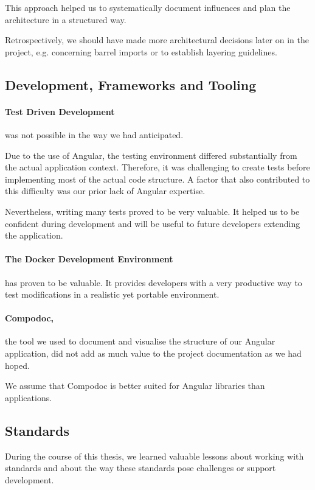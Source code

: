 This approach helped us to systematically document influences and plan the architecture in a structured way.

Retrospectively, we should have made more architectural decisions later on in the project, e.g. concerning barrel imports or to establish layering guidelines.

\subsection{Development, Frameworks and Tooling}

\paragraph{Test Driven Development} was not possible in the way we had anticipated.

Due to the use of Angular, the testing environment differed substantially from the actual application context.
Therefore, it was challenging to create tests before implementing most of the actual code structure.
A factor that also contributed to this difficulty was our prior lack of Angular expertise.

Nevertheless, writing many tests proved to be very valuable.
It helped us to be confident during development and will be useful to future developers extending the application.

\paragraph{The Docker Development Environment} has proven to be valuable.
It provides developers with a very productive way to test modifications in a realistic yet portable environment.

\paragraph{Compodoc,} the tool we used to document and visualise the structure of our Angular application,
did not add as much value to the project documentation as we had hoped.

We assume that Compodoc is better suited for Angular libraries than applications.

\subsection{Standards}\label{lessons-learned-standards}

During the course of this thesis, we learned valuable lessons about working with standards and about the way these standards pose challenges or support development.


